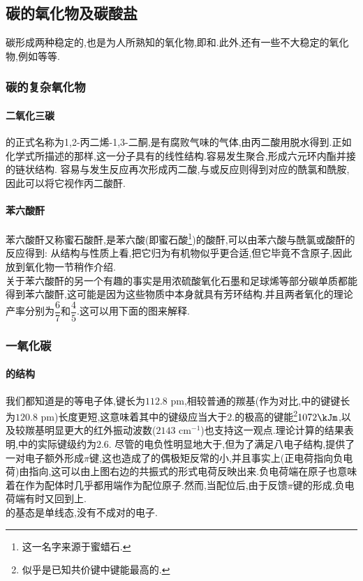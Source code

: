 \documentclass[draft]{ctexart}
\begin{document}
\subsection{碳的氧化物及碳酸盐}
碳形成两种稳定的,也是为人所熟知的氧化物,即和.此外,还有一些不大稳定的氧化物,例如等等.
\subsubsection{碳的复杂氧化物}
\paragraph{二氧化三碳}
的正式名称为1,2-丙二烯-1,3-二酮,是有腐败气味的气体,由丙二酸用脱水得到.正如化学式所描述的那样,这一分子具有的线性结构.容易发生聚合,形成六元环内酯并接的链状结构.
容易与发生反应再次形成丙二酸,与或反应则得到对应的酰氯和酰胺,因此可以将它视作丙二酸酐.
\paragraph{苯六酸酐}
苯六酸酐又称蜜石酸酐,是苯六酸(即蜜石酸\footnote{这一名字来源于蜜蜡石.})的酸酐,可以由苯六酸与酰氯或酸酐的反应得到:
从结构与性质上看,把它归为有机物似乎更合适,但它毕竟不含原子,因此放到氧化物一节稍作介绍.\\
关于苯六酸酐的另一个有趣的事实是用浓硫酸氧化石墨和足球烯等部分碳单质都能得到苯六酸酐,这可能是因为这些物质中本身就具有芳环结构.并且两者氧化的理论产率分别为$\dfrac67$和$\dfrac45$.这可以用下面的图来解释.
\subsubsection{一氧化碳}
\paragraph{的结构}
我们都知道是的等电子体,键长为$112.8\text{ pm}$,相较普通的羰基(作为对比,中的键键长为$120.8\text{ pm}$)长度更短,这意味着其中的键级应当大于$2$.的极高的键能\footnote{似乎是已知共价键中键能最高的.}$1072\kJm$,以及较羰基明显更大的红外振动波数($2143\text{ cm}^{-1}$)也支持这一观点.理论计算的结果表明,中的实际键级约为$2.6$.
尽管的电负性明显地大于,但为了满足八电子结构,提供了一对电子额外形成$\pi$键,这也造成了的偶极矩反常的小,并且事实上(正电荷指向负电荷)由指向,这可以由上图右边的共振式的形式电荷反映出来.负电荷端在原子也意味着在作为配体时几乎都用端作为配位原子.然而,当配位后,由于反馈$\pi$键的形成,负电荷端有时又回到上.\\
\indent {}的基态是单线态,没有不成对的电子.
\end{document}
